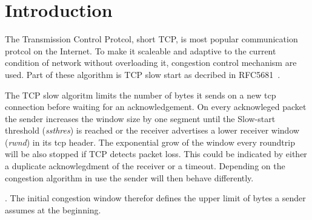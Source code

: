 \section{Introduction}
\label{sec:introduction}

The Transmission Control Protcol, short TCP, is most popular communication
protcol on the Internet. To make it scaleable and adaptive to the current
condition of network without overloading it, congestion control mechanism are
used. Part of these algorithm is TCP slow start as decribed in
RFC5681~\cite{rfc5681}.

The TCP slow algoritm limits the number of bytes it sends on a new tcp
connection before waiting for an acknowledgement. On every acknowleged packet
the sender increases the window size by one segment until the Slow-start
threshold (\emph{ssthres}) is reached  or the receiver advertises a lower
receiver window (\emph{rwnd}) in its tcp header. The exponential grow of the
window every roundtrip will be also stopped if TCP detects packet loss. This
could be indicated by either a duplicate acknowlegdment of the receiver or a
timeout. Depending on the congestion algorithm in use the sender will then
behave differently.


. The initial
congestion window therefor defines the upper limit of bytes a sender assumes at
the beginning.
